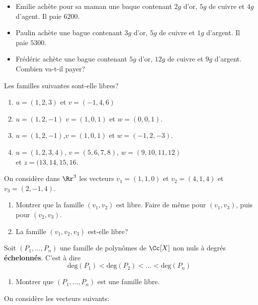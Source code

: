 \documentclass[10pt, a4paper, twocolumn]{homework}
\begin{document}
\begin{itemize}
  \item Emilie achète pour sa maman une baque contenant $2g$ d'or, $5g$ de
    cuivre et $4g$ d'agent. Il paie $6200$.
  \item Paulin achète une bague contenant $3g$ d'or, $5g$ de cuivre et $1g$
    d'argent. Il paie $5300$.
  \item Frédéric achète une bague contenant $5g$ d'or, $12g$ de cuivre et
    $9g$ d'argent. Combien va-t-il payer?
\end{itemize}
Les familles suivantes sont-elle libres?

\begin{enumerate}
  \item $u=(1,2,3)$ et $v=(-1,4,6)$
  \item $u=(1,2,-1)$ $v=(1,0,1)$  et $w=(0,0,1)$.
  \item $u=(1,2,-1)$,$v=(1,0,1)$ et $w=(-1,2,-3)$.
  \item $u=(1,2,3,4)$, $v=(5,6,7,8)$, $w=(9,10,11,12)$\\ et $z=(13,14,15,16$.
\end{enumerate}

On considère dans $\Rr^3$ les vecteurs $v_1=(1,1,0)$ et $v_2=(4,1,4)$ et
$v_3=(2,-1,4)$.\\
\begin{enumerate}
  \item Montrer que la famille $(v_1,v_2)$ est libre. Faire de même pour
    $(v_1, v_3)$, puis pour $(v_2, v_3)$.
  \item La famille $(v_1, v_2, v_3)$ est-elle libre?
\end{enumerate}

Soit $\left(P_1,\ldots, P_n\right)$ une famille de polynômes de $\Cc[X]$ non
nuls à degrés \textbf{échelonnés}. C'est à dire 
$$
\text{deg}(P_1) < \text{deg}(P_2) < \ldots <\text{deg}(P_n)
$$
\begin{enumerate}
  \item Montrer que $\left(P_1, \ldots, P_n\right)$ est une famille libre.
\end{enumerate}

On considère les vecteurs suivants:
\end{document}
